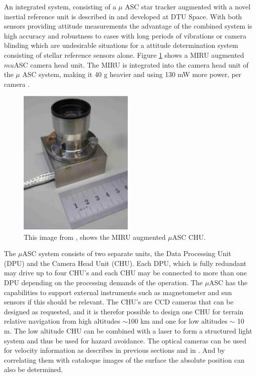 An integrated system, consisting of a $\mu$ ASC star tracker augmented with a novel inertial reference unit is described in \cite{Bjarno} and developed at DTU Space. With both sensors providing attitude measurements the advantage of the combined system is high accuracy and robustness to cases with long periods of vibrations or camera blinding which are undesirable situations for a attitude determination system consisting of stellar reference sensors alone. Figure \ref{miruasc} shows a MIRU augmented $mu$ASC camera head unit. The MIRU is integrated into the camera head unit of the $\mu$ ASC system, making it 40 g heavier and using 130 mW more power, per camera \cite{mirusheet}. 

\begin{figure}[htb]
\begin{center}
\includegraphics[width=0.5\textwidth]{figures/navtheory/chumiro}
\caption{This image from \cite{mirusheet}, shows the MIRU augmented $\mu$ASC CHU.}
\label{miruasc}
\end{center}
\end{figure}

The $\mu$ASC system consists of two separate units, the Data Processing Unit (DPU) and the Camera Head Unit (CHU). Each DPU, which is fully redundant may drive up to four CHU's and each CHU may be connected to more than one DPU depending on the processing demands of the operation. The $\mu$ASC has the capabilities to support external instruments such as magnetometer and sun sensors if this should be relevant. The CHU's are CCD cameras that can be designed as requested, and it is therefor possible to design one CHU for terrain relative navigation from high altitudes $\sim$100 km and one for low altitudes $\sim$ 10 m. The low altitude CHU can be combined with a laser to form a structured light system and thus be used for hazard avoidance. The optical cameras can be used for velocity information as describes in previous sections and in \cite{alessandro}. And by correlating them with cataloque images of the surface the absolute position can also be determined. 

